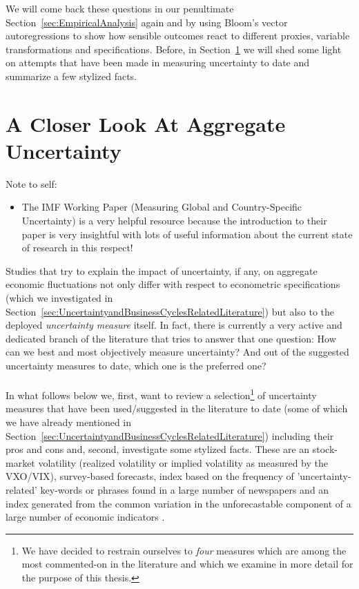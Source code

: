 \documentclass[a4paper,11pt,listof=nochaptergap,oneside,pointednumbers,bibtotoc,bigheadings,liststotoc]{scrbook}
\theoremstyle{mysatz}
\theoremstyle{mydefinition}
\theoremstyle{mybemerkung}
\begin{document}
We will come back these questions in our penultimate Section~\ref{sec:EmpiricalAnalysis} again and by using Bloom's vector autoregressions to show how sensible outcomes react to different proxies, variable transformations and specifications. Before, in Section~\ref{MeasuringUncertaintyandaHistoricalView} we will shed some light on attempts that have been made in measuring uncertainty to date and summarize a few stylized facts.

\chapter{A Closer Look At Aggregate Uncertainty}
\label{MeasuringUncertaintyandaHistoricalView}

\begingroup
    \fontsize{8pt}{12pt}\selectfont
    Note to self:
\begin{itemize}
	\item  The IMF Working Paper (Measuring Global and Country-Specific Uncertainty) is a very helpful resource because the introduction to their paper is very insightful with lots of useful information about the current state of research in this respect!
\end{itemize}
\endgroup


Studies that try to explain the impact of uncertainty, if any, on aggregate economic fluctuations not only differ with respect to econometric specifications (which we investigated in Section~\ref{sec:UncertaintyandBusinessCyclesRelatedLiterature}) but also to the deployed \textit{uncertainty measure} itself. In fact, there is currently a very active and dedicated branch of the literature that tries to answer that one question: How can we best and most objectively measure uncertainty? And out of the suggested uncertainty measures to date, which one is the preferred one?\\
\\
In what follows below we, first, want to review a selection\footnote{We have decided to restrain ourselves to \textit{four} measures which are among the most commented-on in the literature and which we examine in more detail for the purpose of this thesis.} of uncertainty measures that have been used/suggested in the literature to date (some of which we have already mentioned in Section~\ref{sec:UncertaintyandBusinessCyclesRelatedLiterature}) including their pros and cons and, second, investigate some stylized facts. These are an stock-market volatility (realized volatility or implied volatility as measured by the VXO/VIX), survey-based forecasts, index based on the frequency of 'uncertainty-related' key-words or phrases found in a large number of newspapers \citep{bakeretal:15} and an index generated from the common variation in the unforecastable component of a large number of economic indicators \citep{juradoetal:15}.
\end{document}
